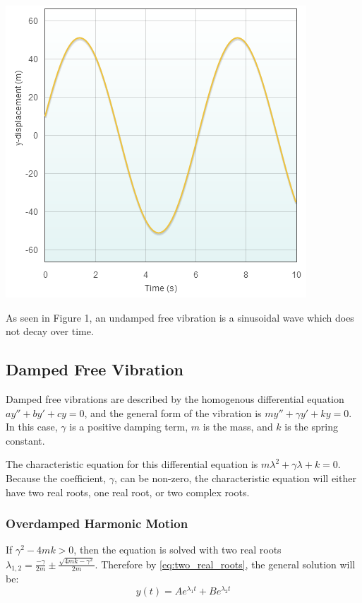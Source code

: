\documentclass[11pt]{article} %
\newenvironment{Figure}
  {\par\medskip\noindent\minipage{\linewidth}}
  {\endminipage\par\medskip}
\begin{document}
\begin{multicols}{2}
\begin{Figure}
 \centering
 \includegraphics[width=\linewidth]{undamped_free.png}
\end{Figure}

As seen in Figure 1, an undamped free vibration is a sinusoidal wave which does not decay over time. 

\subsection {Damped Free Vibration}
Damped free vibrations are described by the homogenous differential equation $ay'' + by' +cy = 0$, and the general form of the vibration is $my'' + {\gamma}y' + ky = 0$. In this case, $\gamma$ is a positive damping term, $m$ is the mass, and $k$ is the spring constant.

The characteristic equation for this differential equation is $m{\lambda}^2 + {\gamma}{\lambda} + k = 0$. Because the coefficient, $\gamma$, can be non-zero, the characteristic equation will either have two real roots, one real root, or two complex roots.
\subsubsection {Overdamped Harmonic Motion}
If ${\gamma}^2 - 4mk > 0$, then the equation is solved with two real roots ${\lambda}_{1,2} = {\frac{-\gamma}{2m}} \pm \frac{\sqrt{4mk - {\gamma}^2}}{2m}$. Therefore by \eqref{eq:two_real_roots}, the general solution will be:
\begin{equation}
y(t) = Ae^{{\lambda}_1t} + Be^{{\lambda}_2t}
\end{equation}


\end{multicols}
\end{document}

